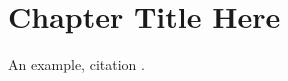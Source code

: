 \chapter{Chapter Title Here}


An example, citation \parencite{Mandel2016}. 

\printbibliography[heading=bibliography,title={References}]

